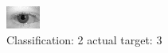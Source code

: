 \begin{figure}[h!]
\begin{center}
\includegraphics[width=0.60\columnwidth]{figures/ID527_class_2_target_3.png}
\end{center}
\caption{ Classification: 2 actual target: 3}
\label{fig:ID527_class_2_target_3}
\end{figure}
